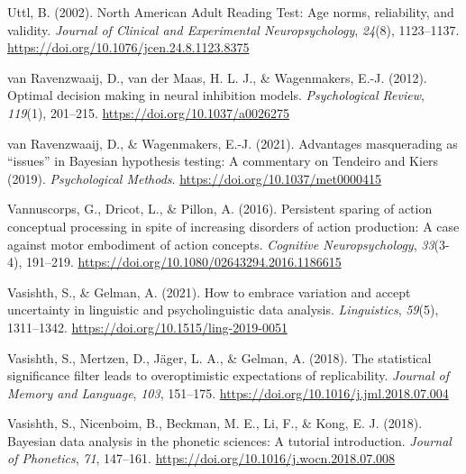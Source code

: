 \documentclass[
  12pt,
  man,floatsintext]{apa7}
\newlength{\cslhangindent}
\newlength{\cslentryspacingunit} %
\newenvironment{CSLReferences}[2] %
 {%
  \setlength{\parindent}{0pt}
  \ifodd #1
  \let\oldpar\par
  \def\par{\hangindent=\cslhangindent\oldpar}
  \fi
  \setlength{\parskip}{#2\cslentryspacingunit}
 }%
 {}
\begin{document}
\begin{CSLReferences}{1}{0}
\leavevmode{}%
Uttl, B. (2002). North {American Adult Reading Test}: {Age} norms, reliability, and validity. \emph{Journal of Clinical and Experimental Neuropsychology}, \emph{24}(8), 1123--1137. \url{https://doi.org/10.1076/jcen.24.8.1123.8375}

\leavevmode{}%
van Ravenzwaaij, D., van der Maas, H. L. J., \& Wagenmakers, E.-J. (2012). Optimal decision making in neural inhibition models. \emph{Psychological Review}, \emph{119}(1), 201--215. \url{https://doi.org/10.1037/a0026275}

\leavevmode{}%
van Ravenzwaaij, D., \& Wagenmakers, E.-J. (2021). Advantages masquerading as {``issues''} in {Bayesian} hypothesis testing: {A} commentary on {Tendeiro} and {Kiers} (2019). \emph{Psychological Methods}. \url{https://doi.org/10.1037/met0000415}

\leavevmode{}%
Vannuscorps, G., Dricot, L., \& Pillon, A. (2016). Persistent sparing of action conceptual processing in spite of increasing disorders of action production: {A} case against motor embodiment of action concepts. \emph{Cognitive Neuropsychology}, \emph{33}(3-4), 191--219. \url{https://doi.org/10.1080/02643294.2016.1186615}

\leavevmode{}%
Vasishth, S., \& Gelman, A. (2021). How to embrace variation and accept uncertainty in linguistic and psycholinguistic data analysis. \emph{Linguistics}, \emph{59}(5), 1311--1342. \url{https://doi.org/10.1515/ling-2019-0051}

\leavevmode{}%
Vasishth, S., Mertzen, D., Jäger, L. A., \& Gelman, A. (2018). The statistical significance filter leads to overoptimistic expectations of replicability. \emph{Journal of Memory and Language}, \emph{103}, 151--175. \url{https://doi.org/10.1016/j.jml.2018.07.004}

\leavevmode{}%
Vasishth, S., Nicenboim, B., Beckman, M. E., Li, F., \& Kong, E. J. (2018). Bayesian data analysis in the phonetic sciences: {A} tutorial introduction. \emph{Journal of Phonetics}, \emph{71}, 147--161. \url{https://doi.org/10.1016/j.wocn.2018.07.008}


\end{CSLReferences}
\end{document}
